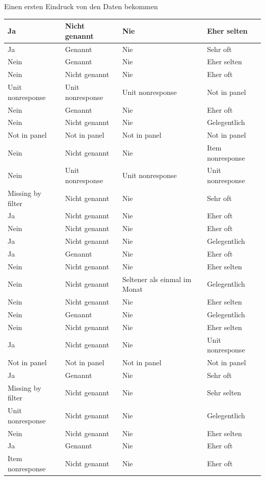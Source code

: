 \documentclass[ignorenonframetext,]{beamer}
\begin{document}
\begin{frame}{Einen ersten Eindruck von den Daten bekommen}
\begin{tabular}{l|l|l|l}
\hline
Ja & Nicht genannt & Nie & Eher selten\\
\hline
Ja & Genannt & Nie & Sehr oft\\
\hline
Nein & Genannt & Nie & Eher selten\\
\hline
Nein & Nicht genannt & Nie & Eher oft\\
\hline
Unit nonresponse & Unit nonresponse & Unit nonresponse & Not in panel\\
\hline
Nein & Genannt & Nie & Eher oft\\
\hline
Nein & Nicht genannt & Nie & Gelegentlich\\
\hline
Not in panel & Not in panel & Not in panel & Not in panel\\
\hline
Nein & Nicht genannt & Nie & Item nonresponse\\
\hline
Nein & Unit nonresponse & Unit nonresponse & Unit nonresponse\\
\hline
Missing by filter & Nicht genannt & Nie & Sehr oft\\
\hline
Ja & Nicht genannt & Nie & Eher oft\\
\hline
Nein & Nicht genannt & Nie & Eher oft\\
\hline
Ja & Nicht genannt & Nie & Gelegentlich\\
\hline
Ja & Genannt & Nie & Eher oft\\
\hline
Nein & Nicht genannt & Nie & Eher selten\\
\hline
Nein & Nicht genannt & Seltener als einmal im Monat & Gelegentlich\\
\hline
Nein & Nicht genannt & Nie & Eher selten\\
\hline
Nein & Genannt & Nie & Gelegentlich\\
\hline
Nein & Nicht genannt & Nie & Eher selten\\
\hline
Ja & Nicht genannt & Nie & Unit nonresponse\\
\hline
Not in panel & Not in panel & Not in panel & Not in panel\\
\hline
Ja & Genannt & Nie & Sehr oft\\
\hline
Missing by filter & Nicht genannt & Nie & Sehr selten\\
\hline
Unit nonresponse & Nicht genannt & Nie & Gelegentlich\\
\hline
Nein & Nicht genannt & Nie & Eher selten\\
\hline
Ja & Genannt & Nie & Eher oft\\
\hline
Item nonresponse & Nicht genannt & Nie & Eher oft\\

\end{tabular}
\end{frame}
\end{document}
